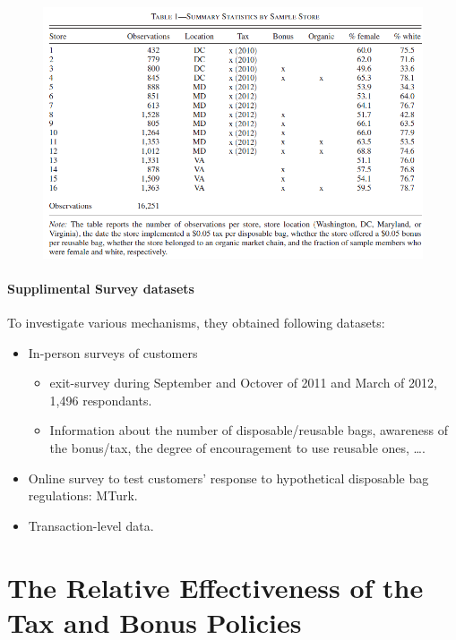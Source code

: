 \documentclass[../root]{subfiles}
\begin{document}
    \begin{figure}[ht]
      \centering
      \includegraphics[scale = 1]{0807tanji/T1}
    \end{figure}

    \paragraph{Supplimental Survey datasets}

    To investigate various mechanisms, they obtained following datasets:

    \begin{itemize}
      \item In-person surveys of customers
      \begin{itemize}
        \item exit-survey during September and Octover of 2011 and March of 2012, 1,496 respondants.
        \item Information about the number of disposable/reusable bags, awareness of the bonus/tax, the degree of encouragement to use reusable ones, \ldots.
      \end{itemize}
      \item Online survey to test customers' response to hypothetical disposable bag regulations: MTurk.
      \item Transaction-level data.
    \end{itemize}


    \section{The Relative Effectiveness of the Tax and Bonus Policies}
\end{document}
